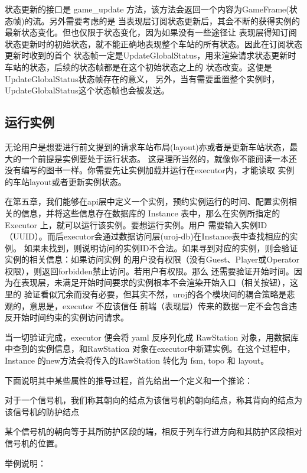 状态更新的接口是 game\_update 方法，该方法会返回一个内容为GameFrame(状态帧)的流。另外需要考虑的是
当表现层订阅状态更新后，其会不断的获得实例的最新状态变化。但也仅限于状态变化，因为如果没有一些途径让
表现层得知订阅状态更新时的初始状态，就不能正确地表现整个车站的所有状态。因此在订阅状态更新时收到的首个
状态帧一定是UpdateGlobalStatus，用来渲染请求状态更新时车站的状态，后续的状态帧都是在这个初始状态之上的
状态改变。这便是UpdateGlobalStatus状态帧存在的意义，
另外，当有需要重置整个实例时，UpdateGlobalStatus这个状态帧也会被发送。

\subsection{运行实例}
无论用户是想要进行前文提到的请求车站布局(layout)亦或者是更新车站状态，最大的一个前提是实例要处于运行状态。
这是理所当然的，就像你不能阅读一本还没有编写的图书一样。你需要先让实例加载并运行在executor内，才能读取
实例的车站layout或者更新实例状态。

在第五章，我们能够在api层中定义一个实例，预约实例运行的时间、配置实例相关的信息，并将这些信息存在数据库的
Instance 表中，那么在实例所指定的Executor 上，就可以运行该实例。要想运行实例。用户
需要输入实例ID（UUID）。而后executor会通过数据访问层(uroj-db)在Instance表中查找相应的实例。
如果未找到，则说明访问的实例ID不合法。如果寻到对应的实例，则会验证实例的相关信息：如果访问实例
的用户没有权限（没有Guest、Player或Operator 权限），则返回forbidden禁止访问。若用户有权限。那么
还需要验证开始时间。因为在表现层，未满足开始时间要求的实例根本不会渲染开始入口（相关按钮），这里的
验证看似冗余而没有必要，但其实不然，uroj的各个模块间的耦合策略是悲观的，意思是，executor 不应该信任
前端（表现层）传来的数据一定不会包含违反开始时间约束的实例访问请求。

当一切验证完成，executor 便会将 yaml 反序列化成 RawStation 对象，用数据库中查到的实例信息，和RawStation
对象在executor中新建实例。在这个过程中，Instance 的new方法会将传入的RawStation 转化为 fsm, topo 和 layout。

下面说明其中某些属性的推导过程，首先给出一个定义和一个推论：
\begin{definition}
    对于一个信号机，我们称其朝向的结点为该信号机的朝向结点，称其背向的结点为该信号机的防护结点
\end{definition}
\begin{corollary}
    某个信号机的朝向等于其所防护区段的端，相反于列车行进方向和其防护区段相对信号机的位置。
\end{corollary}
举例说明：

